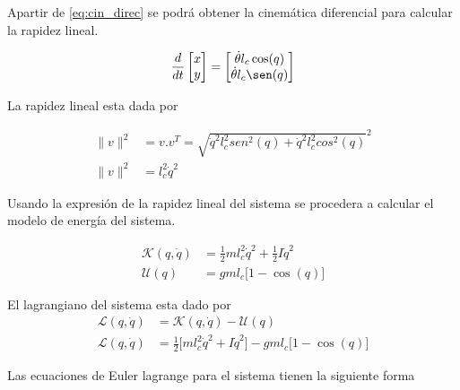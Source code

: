 \documentclass[a4paper]{IEEEtran} %
\begin{document}
Apartir de \ref{eq:cin_direc} se podrá obtener la cinemática diferencial para calcular la rapidez lineal.

\begin{equation}
    \frac{d}{dt}\begin{bmatrix}
        x \\
        y \\
    \end{bmatrix}=
    \begin{bmatrix}
        \dot{\theta}l_c\cos(q)  \\
        \dot{\theta}l_c\sen(q)  \\
    \end{bmatrix}
    \label{eq:speed}
\end{equation}

La rapidez lineal esta dada por

\begin{equation}
    \begin{split}
        \|v\|^2&=v.v^T=\sqrt{\dot{q}^2l_c^2sen^2({q})+\dot{q}^2l_c^2cos^2({q})}^2\\
        \|v\|^2&=l_c^2\dot{q}^2
    \end{split}
    \label{eq:speed_mod}
\end{equation}

Usando la expresión de la rapidez lineal del sistema se procedera a calcular el modelo de energía del sistema.

\begin{equation}
    \begin{split}
        \mathcal{K}(q,\dot{q}) &= \frac{1}{2}ml_c^2\dot q^2+\frac{1}{2}I\dot q^2\\
        \mathcal{U}(q) &= gml_c\lbrack1-\cos({q})\rbrack
    \end{split}
    \label{eq:energy}
\end{equation}

El lagrangiano del sistema esta dado por
\begin{equation}
    \begin{split}
        \mathcal{L}(q,\dot{q})&=\mathcal{K}(q,\dot{q})-\mathcal{U}(q)\\
        \mathcal{L}(q,\dot{q})&=\frac{1}{2}\lbrack ml_c^2\dot q^2+I\dot{q}^2\rbrack-gml_c\lbrack1-\cos({q})\rbrack
    \end{split}
    \label{eq:lagrange}
\end{equation}

Las ecuaciones de Euler lagrange para el sistema tienen la siguiente forma
\end{document}
